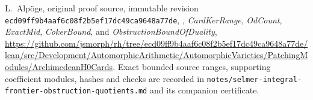 L.~Alp\"oge, original proof source, immutable revision
\texttt{ecd09ff9b4aaf6c08f2b5ef17dc49ca9648a77de},
,
\emph{CardKerRange}, \emph{OdCount}, \emph{ExactMid},
\emph{CokerBound}, and \emph{ObstructionBoundOfDuality},
\url{https://github.com/jsmorph/rh/tree/ecd09ff9b4aaf6c08f2b5ef17dc49ca9648a77de/lean/src/Development/AutomorphicArithmetic/AutomorphicVarieties/PatchingModules/ArchimedeanH0Cards}.
Exact bounded source ranges, supporting coefficient modules,
hashes and checks are recorded in
\texttt{notes/selmer-integral-frontier-obstruction-quotients.md}
and its companion certificate.
